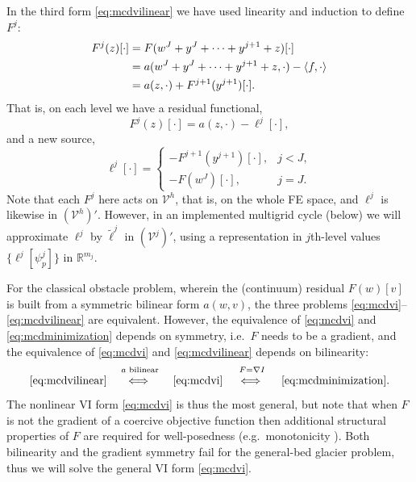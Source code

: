 \documentclass[letterpaper,final,12pt,reqno]{amsart}
\theoremstyle{claim}
\newcommand{\RR}{\mathbb{R}}
\newcommand{\grad}{\nabla}
\newcommand{\ip}[2]{\left<#1,#2\right>}
\numberwithin{equation}{section}
\numberwithin{figure}{section}
\numberwithin{table}{section}
\numberwithin{theorem}{section}
\begin{document}
In the third form \eqref{eq:mcdvilinear} we have used linearity and induction to define $F^j$:
\begin{align}
  F^j(z)[\cdot] &= F(w^J+y^J+\dots+y^{j+1}+z)[\cdot] \label{eq:residuallinearlevelderive} \\
                &= a(w^J+y^J+\dots+y^{j+1}+z,\cdot) - \ip{f}{\cdot} \notag \\
                &= a(z,\cdot) + F^{j+1}(y^{j+1})[\cdot]. \notag
\end{align}
That is, on each level we have a residual functional,
\begin{equation}
  F^j(z)[\cdot] = a(z,\cdot) - \ell^j[\cdot],  \label{eq:residuallinearlevel}
\end{equation}
and a new source,
\begin{equation}
  \ell^j[\cdot] = \begin{cases} - F^{j+1}(y^{j+1})[\cdot], & j < J, \\
                                - F(w^J)[\cdot], & j = J. \end{cases} \label{eq:rhslinearlevel}
\end{equation}
Note that each $F^j$ here acts on $\mathcal{V}^h$, that is, on the whole FE space, and $\ell^j$ is likewise in $(\mathcal{V}^h)'$.  However, in an implemented multigrid cycle (below) we will approximate $\ell^j$ by $\tilde \ell^j$ in $(\mathcal{V}^j)'$, using a representation in $j$th-level values $\{\ell^j[\psi_p^j]\}$ in $\RR^{m_j}$.

For the classical obstacle problem, wherein the (continuum) residual $F(w)[v]$ is built from a symmetric bilinear form $a(w,v)$, the three problems \eqref{eq:mcdvi}--\eqref{eq:mcdvilinear} are equivalent.  However, the equivalence of \eqref{eq:mcdvi} and \eqref{eq:mcdminimization} depends on symmetry, i.e.~$F$ needs to be a gradient, and the equivalence of \eqref{eq:mcdvi} and \eqref{eq:mcdvilinear} depends on bilinearity:
   $$\eqref{eq:mcdvilinear} \quad \stackrel{a \text{ bilinear}}{\iff\strut} \quad \eqref{eq:mcdvi} \quad \stackrel{F=\grad I}{\iff\strut} \quad \eqref{eq:mcdminimization}.$$
The nonlinear VI form \eqref{eq:mcdvi} is thus the most general, but note that when $F$ is not the gradient of a coercive objective function then additional structural properties of $F$ are required for well-posedness (e.g.~monotonicity \cite{Bueler2020,KinderlehrerStampacchia1980}).  Both bilinearity and the gradient symmetry fail for the general-bed glacier problem, thus we will solve the general VI form \eqref{eq:mcdvi}.
\end{document}
